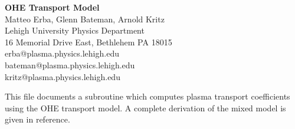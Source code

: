 %
 
\headheight 0pt \headsep 0pt  \topmargin 0pt  \oddsidemargin 0pt
\textheight 9.0in \textwidth 6.5in

\begin{center}
\Large {\bf OHE Transport Model} \\
\vspace{1pc} \normalsize
Matteo Erba, Glenn Bateman, Arnold Kritz \\
 Lehigh University Physics Department \\
16 Memorial Drive East, Bethlehem PA 18015 \\
erba@plasma.physics.lehigh.edu \\
bateman@plasma.physics.lehigh.edu \\
kritz@plasma.physics.lehigh.edu
\end{center}

This file documents a subroutine which computes
plasma transport coefficients using the OHE transport model\cite{ott97}.  
A complete derivation of the mixed model is given in reference.

